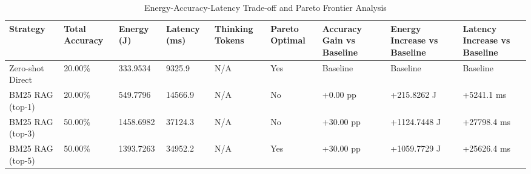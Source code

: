 \begin{table}
\caption{Energy-Accuracy-Latency Trade-off and Pareto Frontier Analysis}
\label{tab:tradeoff_comparison}
\begin{tabular}{lllllllll}
\toprule
Strategy & Total Accuracy & Energy (J) & Latency (ms) & Thinking Tokens & Pareto Optimal & Accuracy Gain vs Baseline & Energy Increase vs Baseline & Latency Increase vs Baseline \\
\midrule
Zero-shot Direct & 20.00\% & 333.9534 & 9325.9 & N/A & Yes & Baseline & Baseline & Baseline \\
BM25 RAG (top-1) & 20.00\% & 549.7796 & 14566.9 & N/A & No & +0.00 pp & +215.8262 J & +5241.1 ms \\
BM25 RAG (top-3) & 50.00\% & 1458.6982 & 37124.3 & N/A & No & +30.00 pp & +1124.7448 J & +27798.4 ms \\
BM25 RAG (top-5) & 50.00\% & 1393.7263 & 34952.2 & N/A & Yes & +30.00 pp & +1059.7729 J & +25626.4 ms \\
\bottomrule
\end{tabular}
\end{table}
